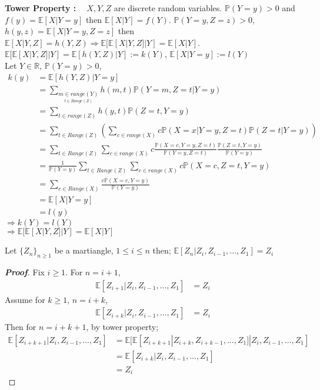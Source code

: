\documentclass[main]{subfiles}
\begin{document}
\textbf{Tower Property : \ } $X, Y, Z$ are discrete random variables. $\mathbb{P}(Y=y) > 0$ and $f(y) = \mathbb{E}[X|Y=y]$ then $\mathbb{E}[X|Y] = f(Y)$. $\mathbb{P}(Y=y,Z=z) > 0$, $h(y,z) = \mathbb{E}[X|Y=y,Z=z]$ then $\mathbb{E}[X|Y,Z] = h(Y,Z) \Longrightarrow \mathbb{E}[\mathbb{E}[X|Y,Z]|Y] = \mathbb{E}[X|Y]$.\\

$\mathbb{E}[\mathbb{E}[X|Y,Z]|Y] = \mathbb{E}[h(Y,Z)|Y] := k(Y)$, $\mathbb{E}[X|Y=y] := l(Y)$ \\
Let $Y \in \mathbb{R}$, $\mathbb{P}(Y=y) > 0$, 
\begin{align*}
    k(y)    & = \mathbb{E}[h(Y,Z)|Y=y]\\
            & = \sum\limits_{\underset{t \in Range(Z)}{m \in range(Y)}} h(m,t)\mathbb{P}(Y=m,Z=t|Y=y)\\
            & = \sum\limits_{t \in range(Z)} h(y,t)\mathbb{P}(Z=t,Y=y)\\
            & = \sum\limits_{t \in Range(Z)}(\sum\limits_{c \in range(X)} c\mathbb{P}(X=x|Y=y,Z=t)\mathbb{P}(Z=t|Y=y))\\
            & = \sum\limits_{t \in Range(Z)}\sum\limits_{c \in range(X)} c \frac{\mathbb{P}(X=c,Y=y,Z=t)}{\mathbb{P}(Y=y,Z=t)} \frac{\mathbb{P}(Z=t,Y=y)}{\mathbb{P}(Y=y)}\\
            & = \frac{1}{\mathbb{P}(Y=y)}\sum\limits_{t \in Range(Z)}\sum\limits_{c \in range(X)} c\mathbb{P}(X=c,Z=t,Y=y)\\
            & = \sum\limits_{c \in Range(X)} \frac{c\mathbb{P}(X=c,Y=y)}{\mathbb{P}(Y=y)}\\
            & = \mathbb{E}[X|Y=y] \\
            & = l(y)
\end{align*}
$\Longrightarrow k(Y) = l(Y)$\\
$\Longrightarrow \mathbb{E}[\mathbb{E}[X|Y,Z]|Y] = \mathbb{E}[X|Y]$

\begin{lemma}
Let $\{Z_n\}_{n \geq 1}$ be a martiangle, $1\leq i\leq n$ then; $\mathbb{E}[Z_n | Z_i, Z_{i-1},..., Z_1] = Z_i$
\end{lemma}
\begin{proof}[\textbf{Proof}]
    Fix $i \geq 1 .$ For $n = i+1$,
    \begin{align*}
        \mathbb{E}[Z_{i+1} | Z_i, Z_{i-1},..., Z_1] & = Z_i
    \end{align*}
    Assume for $k \geq 1$, $n=i+k$,
    \begin{align*}
        \mathbb{E}[Z_{i+k} | Z_i, Z_{i-1},..., Z_1] & = Z_i
    \end{align*}
    Then for $n=i+k+1$, by tower property;
    \begin{align*}
        \mathbb{E}[Z_{i+k+1} | Z_i, Z_{i-1},..., Z_1] & = \mathbb{E}[\mathbb{E}[Z_{i+k+1} | Z_{i+k}, Z_{i+k-1},..., Z_1]| Z_i, Z_{i-1},..., Z_1]\\
                                                    & = \mathbb{E}[Z_{i+k} | Z_i, Z_{i-1},..., Z_1]\\
                                                    & = Z_i
    \end{align*}    
\end{proof}
\end{document}
